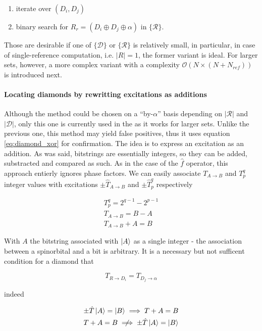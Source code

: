 \documentclass[./thesis.tex]{subfiles}
\begin{document}
\begin{enumerate}
\item
iterate over $(D_i, D_j)$
\item
binary search for $R_r = (D_i \oplus D_j \oplus \alpha)$ in $\{\mathcal{R}\}$. 
\end{enumerate}

Those are desirable if one of $\{\mathcal{D}\}$ or $\{\mathcal{R}\}$ is relatively small, in particular, in case of single-reference computation, i.e. $|R|=1$, the former variant is ideal. For larger sets, however, a more complex variant with a complexity $\mathcal{O}(N \times (N+N_{ref}))$ is introduced next.


\paragraph{Locating diamonds by rewritting excitations as additions}
Although the method could be chosen on a ``by-$\alpha$'' basis depending on $|\mathcal{R}|$ and $|\mathcal{D}|$, only this one is currently used in the \QP as it works for larger sets.
Unlike the previous one, this method may yield false positives, thus it uses equation \ref{eq:diamond_xor} for confirmation.
The idea is to express an excitation as an addition. As was said, bitstrings are essentially integers, so they can be added, substracted and compared as such. As in the case of the $\hat f$ operator, this approach entierly ignores phase factors. We can easily associate $T_{A \rightarrow B}$ and $T_p^q$ integer values with  excitations $\pm \hat T_{A \rightarrow B}$ and $\pm \hat T_p^q$ respectively

\begin{align}
T_p^q = 2^{q-1} - 2^{p-1} \\
T_{A \rightarrow B} = B - A \\
T_{A \rightarrow B} + A = B 
\end{align}

With $A$ the bitstring associated with $\ket A$ as a single integer - the association between a spinorbital and a bit is arbitrary. It is a necessary but not sufficent condition for a diamond that

\begin{equation}
T_{R \rightarrow D_i} = T_{D_j \rightarrow \alpha}
\end{equation}

indeed 

\begin{align}
\pm \hat T \ket A = \ket B \implies  T + A = B\\
T + A = B \centernot \implies \pm \hat T \ket A = \ket B
\end{align}
\end{document}
